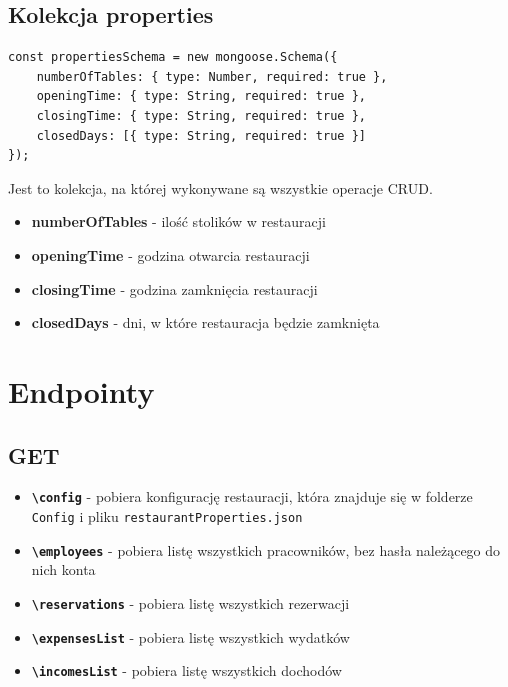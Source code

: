 \documentclass[12pt]{article}
\begin{document}
\newpage
\begin{samepage}
\subsection{Kolekcja properties}
\begin{lstlisting}[caption={Properties}]
const propertiesSchema = new mongoose.Schema({
    numberOfTables: { type: Number, required: true },
    openingTime: { type: String, required: true },
    closingTime: { type: String, required: true },
    closedDays: [{ type: String, required: true }]
});
\end{lstlisting}
Jest to kolekcja, na której wykonywane są wszystkie operacje CRUD.
\end{samepage}

\begin{itemize}
	\item \textbf{numberOfTables} - ilość stolików w restauracji
	\item \textbf{openingTime} - godzina otwarcia restauracji
	\item \textbf{closingTime} - godzina zamknięcia restauracji
	\item \textbf{closedDays} - dni, w które restauracja będzie zamknięta
\end{itemize}

\newpage
\section{Endpointy}
\subsection{GET}
\begin{itemize}
    \item \textbf{\texttt{\textbackslash config}} - pobiera konfigurację restauracji, która znajduje się w folderze \texttt{Config} i pliku \texttt{restaurantProperties.json}
    \item \textbf{\texttt{\textbackslash employees}} - pobiera listę wszystkich pracowników, bez hasła należącego do nich konta
    \item \textbf{\texttt{\textbackslash reservations}} - pobiera listę wszystkich rezerwacji
    \item \textbf{\texttt{\textbackslash expensesList}} - pobiera listę wszystkich wydatków
    \item \textbf{\texttt{\textbackslash incomesList}} - pobiera listę wszystkich dochodów
\end{itemize}
\end{document}

